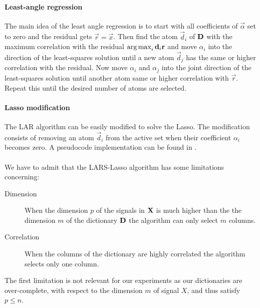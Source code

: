 \paragraph{Least-angle regression}
The main idea of the least angle regression is to start with all coefficients
of $\vec{\alpha}$ set to zero and the residual gets $\vec{r}=\vec{x}$. Then
find the atom $\vec{d}_i$ of $\boldsymbol{\mathrm{D}}$ with the maximum correlation
with the residual $\operatorname*{arg\,max}_i\boldsymbol{\mathrm{d}}_i\boldsymbol{\mathrm{r}}$ and move $\alpha_i$ 
into the direction of the least-squares solution until a new atom
$\vec{d}_j$ has the same or higher correlation with the residual. Now move
$\alpha_i$ and $\alpha_j$ into the joint direction of the least-squares
solution until another atom same or higher correlation with $\vec{r}$. Repeat
this until the desired number of atoms are selected.



\paragraph{Lasso modification}
The LAR algorithm can be easily modified to solve the Lasso. 
The modification consists of removing an atom $\vec{d}_i$ from the active set
when their coefficient $\alpha_i$ becomes zero. A pseudocode implementation can
be found in .

\paragraph{}
We have to admit that the LARS-Lasso algorithm has some limitations concerning:
\begin{description}
 \item[Dimension] When the dimension $p$ of the signals in $\boldsymbol{\mathrm{X}}$ is much
higher than the the dimension $m$ of the dictionary $\boldsymbol{\mathrm{D}}$ the algorithm can
only select $m$ columns.
  \item[Correlation] When the columns of the dictionary are highly correlated
the algorithm selects only one column.
\end{description}
The first limitation is not relevant for our experiments as our dictionaries
are over-complete, with respect to the dimension $m$ of signal $X$, and thus
satisfy $p\leq n$. 




